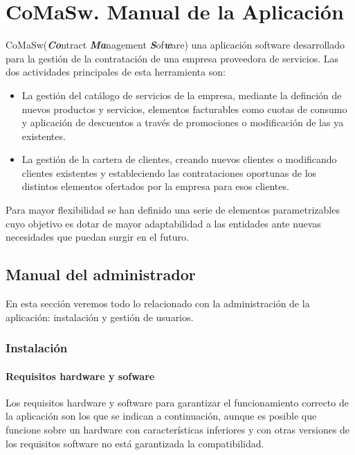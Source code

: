 \chapter{CoMaSw. Manual de la Aplicación}
\label{chap:manual}

\lettrine{CoMaSw} (\emph{\textbf{Co}}ntract \emph{\textbf{Ma}}nagement \emph{\textbf{S}}of\emph{\textbf{w}}are) una aplicación software desarrollado para la gestión de la contratación de una empresa proveedora de servicios. Las dos actividades principales de esta herramienta son:

\begin{itemize}
\item La gestión del catálogo de servicios de la empresa, mediante la definción de nuevos productos y servicios, elementos facturables como cuotas de consumo y aplicación de descuentos a través de promociones o modificación de las ya existentes.
\item La gestión de la cartera de clientes, creando nuevos clientes o modificando clientes existentes y estableciendo las contrataciones oportunas de los distintos elementos ofertados por la empresa para esos clientes.
\end{itemize}

Para mayor flexibilidad se han definido una serie de elementos parametrizables cuyo objetivo es dotar de mayor adaptabilidad a las entidades ante nuevas necesidades que puedan surgir en el futuro.




\section{Manual del administrador}
\label{sec:manual-administrador}

En esta sección veremos todo lo relacionado con la administración de la aplicación: instalación y gestión de usuarios.

\subsection{Instalación}
\label{sub:instalacion}

\subsubsection{Requisitos hardware y sofware}
\label{sub:requisitos}

Los requisitos hardware y software para garantizar el funcionamiento correcto de
la aplicación son los que se indican a continuación, aunque es posible que funcione
sobre un hardware con características inferiores y con otras versiones de los requisitos
software no está garantizada la compatibilidad.\newline


